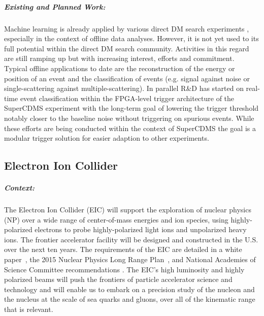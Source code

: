 \subparagraph*{Existing and Planned Work:} Machine learning is already applied by various direct DM search experiments \cite{Khosa_2020, Szydagis:2021hfh, Simola_2019}, especially in the context of offline data analyses. However, it is not yet used to its full potential within the direct DM search community. Activities in this regard are still ramping up but with increasing interest, efforts and commitment. Typical offline applications to date are the reconstruction of the energy or position of an event and the classification of events (e.g. signal against noise or single-scattering against multiple-scattering). In parallel R\&D has started on real-time event classification within the FPGA-level trigger architecture of the SuperCDMS experiment \cite{Agnese_2017} with the long-term goal of lowering the trigger threshold notably closer to the baseline noise without triggering on spurious events. While these efforts are being conducted within the context of SuperCDMS the goal is a modular trigger solution for easier adaption to other experiments.

\subsection{Electron Ion Collider}

\subparagraph*{Context:}
        The Electron Ion Collider (EIC) will support the exploration of nuclear physics (NP) over a wide range of center-of-mass energies and ion species, using highly-polarized electrons to probe highly-polarized light ions and unpolarized heavy ions. The frontier accelerator facility will be designed and constructed in the U.S. over the next ten years. The requirements of the EIC are detailed in a white paper~\cite{Accardi:2012qut}, the 2015 Nuclear Physics Long Range Plan~\cite{Geesaman:2015fha}, and National Academies of Science Committee recommendations \cite{NAS:2018eic}. The EIC’s high luminosity and highly polarized beams will push the frontiers of particle accelerator science and technology and will enable us to embark on a precision study of the nucleon and the nucleus at the scale of sea quarks and gluons, over all of the kinematic range that is relevant. 


